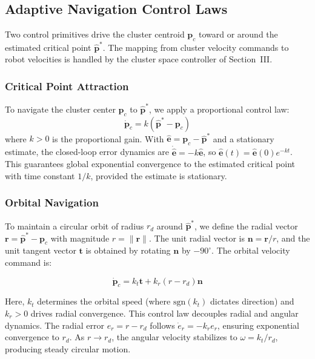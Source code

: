 \documentclass[lettersize,journal]{IEEEtran}
\begin{document}
\subsection{Adaptive Navigation Control Laws}
\label{sec:control_primitives}

Two control primitives drive the cluster centroid $\mathbf{p}_c$ toward or around the estimated critical point $\hat{\mathbf{p}}^*$. The mapping from cluster velocity commands to robot velocities is handled by the cluster space controller of Section~III.

\subsubsection{Critical Point Attraction}
To navigate the cluster center $\mathbf{p}_c$ to $\hat{\mathbf{p}}^*$, we apply a proportional control law:
\begin{equation}\label{eq:10}
\dot{\mathbf{p}}_c = k(\hat{\mathbf{p}}^* - \mathbf{p}_c)
\end{equation}
where $k > 0$ is the proportional gain. With $\hat{\mathbf{e}} = \mathbf{p}_c - \hat{\mathbf{p}}^*$ and a stationary estimate, the closed-loop error dynamics are $\dot{\hat{\mathbf{e}}} = -k\hat{\mathbf{e}}$, so $\hat{\mathbf{e}}(t) = \hat{\mathbf{e}}(0)e^{-kt}$. This guarantees global exponential convergence to the estimated critical point with time constant $1/k$, provided the estimate is stationary.

\subsubsection{Orbital Navigation}
To maintain a circular orbit of radius $r_d$ around $\hat{\mathbf{p}}^*$, we define the radial vector $\mathbf{r} = \hat{\mathbf{p}}^* - \mathbf{p}_c$ with magnitude $r = \|\mathbf{r}\|$. The unit radial vector is $\mathbf{n} = \mathbf{r}/r$, and the unit tangent vector $\mathbf{t}$ is obtained by rotating $\mathbf{n}$ by $-90^\circ$. The orbital velocity command is:

\begin{equation}\label{eq:11}
\dot{\mathbf{p}}_c = k_t \mathbf{t} + k_r(r - r_d)\mathbf{n}
\end{equation}

Here, $k_t$ determines the orbital speed (where $\text{sgn}(k_t)$ dictates direction) and $k_r > 0$ drives radial convergence.
This control law decouples radial and angular dynamics. The radial error $e_r = r - r_d$ follows $\dot{e}_r = -k_r e_r$, ensuring exponential convergence to $r_d$. As $r \to r_d$, the angular velocity stabilizes to $\omega = k_t/r_d$, producing steady circular motion.
\end{document}

